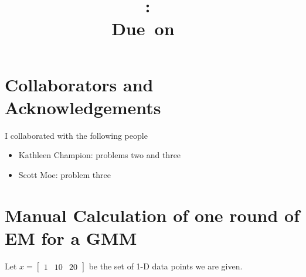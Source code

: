 \documentclass{article}
\title{
    \vspace{2in}
    \textmd{\textbf{\hmwkClass:\ \hmwkTitle}}\\
    \normalsize\vspace{0.1in}\small{Due\ on\ \hmwkDueDate\ }\\
    \vspace{3in}
}
\author{\textbf{\hmwkAuthorName}}
\date{}
\newcommand{\bbm}{\begin{bmatrix}}
\newcommand{\ebm}{\end{bmatrix}}
\begin{document}
\maketitle

\pagebreak

\section{Collaborators and Acknowledgements}

I collaborated with the following people
\begin{itemize}
    \item Kathleen Champion: problems two and three
    \item Scott Moe: problem three
\end{itemize}

\section{Manual Calculation of one round of EM for a GMM}
Let $x=\bbm 1&10&20\ebm$ be the set of 1-D data points we are given.
\end{document}
